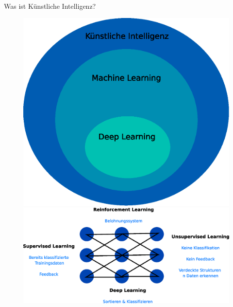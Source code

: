 \documentclass{beamer}
\begin{document}
\begin{frame}{Was ist Künstliche Intelligenz?}
{        \begin{figure}
          \begin{minipage}{0.29 \textwidth}
            \includegraphics[width = \textwidth]{Pictures/AI.eps}
          \end{minipage}
          \begin{minipage}{0.69 \textwidth}
            \includegraphics[width = \textwidth]{Pictures/Categories.eps}
          \end{minipage}
        \end{figure}
      }



\end{frame}
\end{document}
